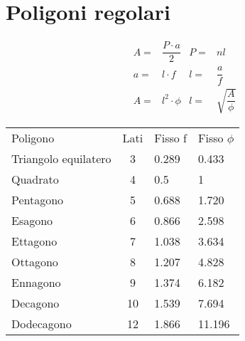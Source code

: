\section{Poligoni regolari}
\begin{tcolorbox}[sidebyside,righthand width=9cm,colback=white,colframe=white,fonttitle=\bfseries	]
	
	\tcblower
	\begin{align*}
	A=&\dfrac{P\cdot a}{2} & P=&nl	\\
	a=&l\cdot f & l=&\dfrac{a}{f}	\\
	A=&l^2\cdot\phi&l=&\sqrt{\dfrac{A}{\phi}}
	\end{align*}
\end{tcolorbox}
\begin{center}
	\begin{tabular}{lcll}
		\toprule
Poligono	&  Lati&  Fisso f&Fisso $\phi$ \\ 
Triangolo equilatero	& 3 & 0.289 &0.433\\ 
Quadrato	& 4 & 0.5&1 \\ 
Pentagono	& 5 &0.688 &1.720 \\ 
Esagono	& 6 &0.866 &2.598 \\ 
Ettagono	& 7 &1.038&3.634 \\ 
Ottagono	& 8 &1.207&4.828 \\ 
Ennagono	& 9&  1.374&6.182\\ 
Decagono	& 10 & 1.539&7.694 \\ 
Dodecagono	&  12&  1.866&11.196\\
\bottomrule
\end{tabular}
\end{center}
